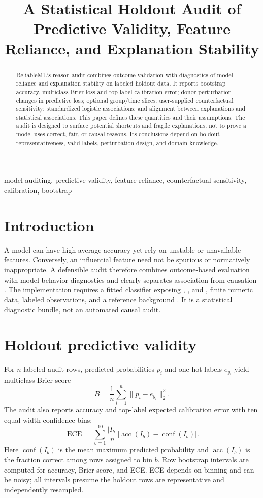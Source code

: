 \documentclass[conference]{IEEEtran}
\title{A Statistical Holdout Audit of Predictive Validity, Feature Reliance, and Explanation Stability}
\author{
\jabulaniauthor
\and
\martinchanzauthor
\and
\oloratoauthor
\and
\mfundoauthor
}
\begin{document}
\maketitle

\begin{abstract}
ReliableML's reason audit combines outcome validation with diagnostics of model reliance and explanation stability on labeled holdout data. It reports bootstrap accuracy, multiclass Brier loss and top-label calibration error; donor-perturbation changes in predictive loss; optional group/time slices; user-supplied counterfactual sensitivity; standardized logistic associations; and alignment between explanations and statistical associations. This paper defines these quantities and their assumptions. The audit is designed to surface potential shortcuts and fragile explanations, not to prove a model uses correct, fair, or causal reasons. Its conclusions depend on holdout representativeness, valid labels, perturbation design, and domain knowledge.
\end{abstract}

\begin{IEEEkeywords}
model auditing, predictive validity, feature reliance, counterfactual sensitivity, calibration, bootstrap
\end{IEEEkeywords}

\section{Introduction}
A model can have high average accuracy yet rely on unstable or unavailable features. Conversely, an influential feature need not be spurious or normatively inappropriate. A defensible audit therefore combines outcome-based evaluation with model-behavior diagnostics and clearly separates association from causation \cite{pearl2009}. The implementation requires a fitted classifier exposing , , and , finite numeric data, labeled observations, and a reference background \cite{software}. It is a statistical diagnostic bundle, not an automated causal audit.

\section{Holdout predictive validity}
For \(n\) labeled audit rows, predicted probabilities \(p_i\) and one-hot labels \(e_{y_i}\) yield multiclass Brier score
\[
B=\frac1n\sum_{i=1}^n\|p_i-e_{y_i}\|_2^2.
\]
The audit also reports accuracy and top-label expected calibration error with ten equal-width confidence bins:
\[
\operatorname{ECE}=\sum_{b=1}^{10}\frac{|I_b|}{n}
\left|\operatorname{acc}(I_b)-\operatorname{conf}(I_b)\right|.
\]
Here \(\operatorname{conf}(I_b)\) is the mean maximum predicted probability and \(\operatorname{acc}(I_b)\) is the fraction correct among rows assigned to bin \(b\). Row bootstrap intervals are computed for accuracy, Brier score, and ECE. ECE depends on binning and can be noisy; all intervals presume the holdout rows are representative and independently resampled.
\end{document}
